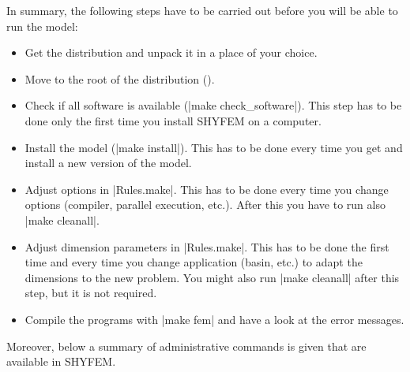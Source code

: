 
In summary, the following steps have to be carried out before you will
be able to run the model:

\begin{itemize}

\item Get the distribution and unpack it in a place of your choice.

\item Move to the root of the distribution ().

\item Check if all software is available (|make check_software|). This
step has to be done only the first time you install SHYFEM on a computer.

\item Install the model (|make install|). This has to be done every time
you get and install a new version of the model.

\item Adjust options in |Rules.make|. This has to be done every time you
change options (compiler, parallel execution, etc.). After this you have
to run also |make cleanall|.

\item Adjust dimension parameters in |Rules.make|. This has to be done the
first time and every time you change application (basin, etc.) to adapt
the dimensions to the new problem. You might also run |make cleanall|
after this step, but it is not required.

\item Compile the programs with |make fem| and have a look at the error
messages.

\end{itemize}

Moreover, below a summary of administrative commands is given that are
available in SHYFEM. \vspace{0.5cm}

